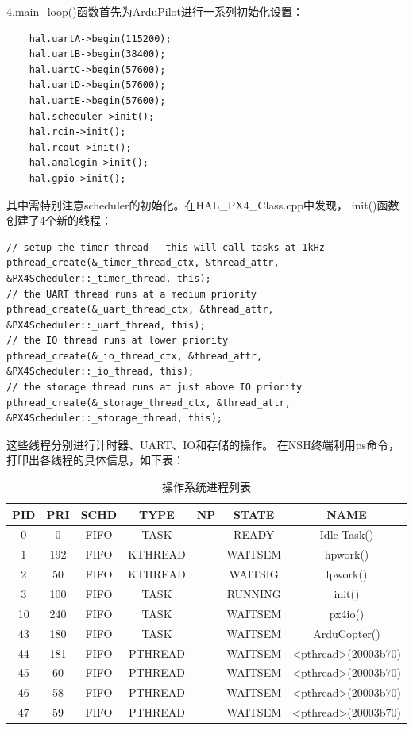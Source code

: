 \documentclass[a4paper,10pt]{ctexart} %
\begin{document}
4.main\_loop()函数首先为ArduPilot进行一系列初始化设置：
\begin{lstlisting}
    hal.uartA->begin(115200);
    hal.uartB->begin(38400);
    hal.uartC->begin(57600);
    hal.uartD->begin(57600);
    hal.uartE->begin(57600);
    hal.scheduler->init();
    hal.rcin->init();
    hal.rcout->init();
    hal.analogin->init();
    hal.gpio->init();	
\end{lstlisting}
其中需特别注意scheduler的初始化。在HAL\_PX4\_Class.cpp中发现，
init()函数创建了4个新的线程：
\begin{lstlisting}
// setup the timer thread - this will call tasks at 1kHz
pthread_create(&_timer_thread_ctx, &thread_attr, &PX4Scheduler::_timer_thread, this);
// the UART thread runs at a medium priority
pthread_create(&_uart_thread_ctx, &thread_attr, &PX4Scheduler::_uart_thread, this);
// the IO thread runs at lower priority
pthread_create(&_io_thread_ctx, &thread_attr, &PX4Scheduler::_io_thread, this);
// the storage thread runs at just above IO priority
pthread_create(&_storage_thread_ctx, &thread_attr, &PX4Scheduler::_storage_thread, this);
\end{lstlisting}
这些线程分别进行计时器、UART、IO和存储的操作。
在NSH终端利用ps命令，打印出各线程的具体信息，如下表：
\begin{table}[h] \centering   %
\caption{操作系统进程列表}
\begin{tabular}{c|c|c|c|c|c|c}\hline
PID & PRI & SCHD & TYPE    & NP & STATE & NAME \\\hline
 0  &  0  & FIFO & TASK    &    & READY & Idle Task() \\
 1  & 192 & FIFO & KTHREAD &    & WAITSEM & hpwork() \\
 2  &  50 & FIFO & KTHREAD &    & WAITSIG & lpwork() \\
 3  & 100 & FIFO & TASK    &    & RUNNING & init() \\
10  & 240 & FIFO & TASK    &    & WAITSEM & px4io() \\
43  & 180 & FIFO & TASK    &    & WAITSEM & ArduCopter() \\
44  & 181 & FIFO & PTHREAD &    & WAITSEM & <pthread>(20003b70) \\
45  & 60  & FIFO & PTHREAD &    & WAITSEM & <pthread>(20003b70) \\
46  & 58  & FIFO & PTHREAD &    & WAITSEM & <pthread>(20003b70) \\
47  & 59  & FIFO & PTHREAD &    & WAITSEM & <pthread>(20003b70) \\\hline
\end{tabular}\label{table2}
\end{table}
\end{document}
